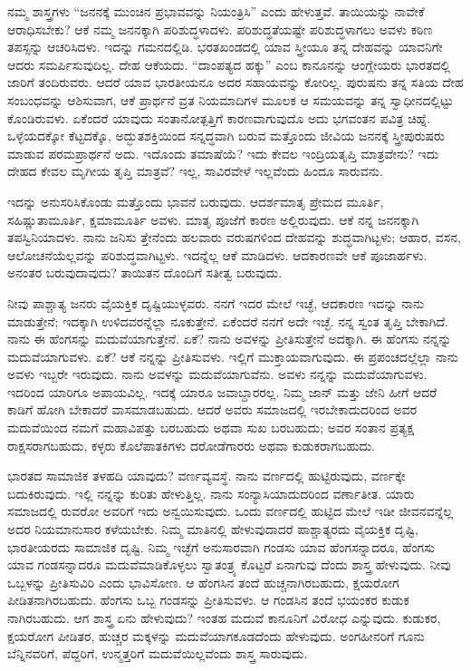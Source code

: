 ನಮ್ಮ ಶಾಸ್ತ್ರಗಳು “ಜನನಕ್ಕೆ ಮುಂಚಿನ ಪ್ರಭಾವವನ್ನು ನಿಯಂತ್ರಿಸಿ” ಎಂದು ಹೇಳುತ್ತವೆ. ತಾಯಿಯನ್ನು ನಾವೇಕೆ ಆರಾಧಿಸಬೇಕು? ಆಕೆ ನಮ್ಮ ಜನನಕ್ಕಾಗಿ ಪರಿಶುದ್ಧಳಾದಳು. ಪರಿಶುದ್ಧತೆಯಷ್ಟೇ ಪರಿಶುದ್ಧಳಾಗಲು ಅವಳು ಕಠಿಣ ತಪಸ್ಸನ್ನು ಆಚರಿಸಿದಳು. ಇದನ್ನು ಗಮನದಲ್ಲಿಡಿ. ಭರತಖಂಡದಲ್ಲಿ ಯಾವ ಸ್ತ್ರೀಯೂ ತನ್ನ ದೇಹವನ್ನು ಯಾವನಿಗೇ ಆದರು ಸಮರ್ಪಿಸುವುದಿಲ್ಲ. ದೇಹ ಆಕೆಯದು. “ದಾಂಪತ್ಯದ ಹಕ್ಕು” ಎಂಬ ಕಾನೂನನ್ನು ಆಂಗ್ಲೇಯರು ಭಾರತದಲ್ಲಿ ಜಾರಿಗೆ ತಂದಿರುವರು. ಆದರೆ ಯಾವ ಭಾರತೀಯನೂ ಅದರ ಸಹಾಯವನ್ನು ಕೋರಿಲ್ಲ. ಪುರುಷನು ತನ್ನ ಸತಿಯ ದೇಹ ಸಂಬಂಧವನ್ನು ಆಶಿಸುವಾಗ, ಆಕೆ ಪ್ರಾರ್ಥನೆ ವ್ರತ ನಿಯಮಾದಿಗಳ ಮೂಲಕ ಆ ಸಮಯವನ್ನು ತನ್ನ ಸ್ವಾಧೀನದಲ್ಲಿಟ್ಟು ಕೊಂಡಿರುವಳು. ಏಕೆಂದರೆ ಯಾವುದು ಸಂತಾನೋತ್ಪತ್ತಿಗೆ ಕಾರಣವಾಗುವುದೊ ಅದು ಭಗವಂತನ ಪವಿತ್ರ ಚಿಹ್ನೆ. ಒಳ್ಳೆಯದಕ್ಕೋ ಕೆಟ್ಟದಕ್ಕೊ, ಅದ್ಭುತಶಕ್ತಿಯಿಂದ ಸನ್ನದ್ಧವಾಗಿ ಬರುವ ಮತ್ತೊಂದು ಜೀವಿಯ ಜನನಕ್ಕೆ ಸ್ತ್ರೀಪುರುಷರು ಮಾಡುವ ಪರಮಪ್ರಾರ್ಥನೆ ಅದು. ಇದೊಂದು ತಮಾಷೆಯೆ? ಇದು ಕೇವಲ ಇಂದ್ರಿಯತೃಪ್ತಿ ಮಾತ್ರವೇನು? ಇದು ದೇಹದ ಕೇವಲ ಮೃಗೀಯ ತೃಪ್ತಿ ಮಾತ್ರವೆ? ಇಲ್ಲ, ಸಾವಿರವೇಳೆ ಇಲ್ಲವೆಂದು ಹಿಂದೂ ಸಾರುವನು.

ಇದನ್ನು ಅನುಸರಿಸಿಕೊಂಡು ಮತ್ತೊಂದು ಭಾವನೆ ಬರುವುದು. ಆದರ್ಶಮಾತೃ ಪ್ರೇಮದ ಮೂರ್ತಿ, ಸಹಿಷ್ಣುತಾಮೂರ್ತಿ, ಕ್ಷಮಾಮೂರ್ತಿ ಅವಳು. ಮಾತೃ ಪೂಜೆಗೆ ಕಾರಣ ಅಲ್ಲಿರುವುದು. ಆಕೆ ನನ್ನ ಜನನಕ್ಕಾಗಿ ತಪಸ್ವಿನಿಯಾದಳು. ನಾನು ಜನಿಸು ತ್ತೇನೆಂದು ಹಲವಾರು ವರುಷಗಳಿಂದ ದೇಹವನ್ನು ಶುದ್ಧವಾಗಿಟ್ಟಳು; ಆಹಾರ, ವಸನ, ಆಲೋಚನೆಯೆಲ್ಲವನ್ನು ಪರಿಶುದ್ಧವಾಗಿಟ್ಟಳು. ಇದನ್ನೆಲ್ಲ ಆಕೆ ಮಾಡಿದಳು. ಆದಕಾರಣವೇ ಆಕೆ ಪೂಜಾರ್ಹಳು. ಅನಂತರ ಬರುವುದಾವುದು? ತಾಯಿತನ ದೊಂದಿಗೆ ಸತೀತ್ವ ಬರುವುದು.

ನೀವು ಪಾಶ್ಚಾತ್ಯ ಜನರು ವೈಯಕ್ತಿಕ ದೃಷ್ಟಿಯುಳ್ಳವರು. ನನಗೆ ಇದರ ಮೇಲೆ ಇಚ್ಛೆ, ಆದಕಾರಣ ಇದನ್ನು ನಾನು ಮಾಡುತ್ತೇನೆ; ಇದಕ್ಕಾಗಿ ಉಳಿದವರನ್ನೆಲ್ಲಾ ನೂಕುತ್ತೇನೆ. ಏಕೆಂದರೆ ನನಗೆ ಅದೇ ಇಚ್ಛೆ. ನನ್ನ ಸ್ವಂತ ತೃಪ್ತಿ ಬೇಕಾಗಿದೆ. ನಾನು ಈ ಹೆಂಗಸನ್ನು ಮದುವೆಯಾಗುತ್ತೇನೆ. ಏಕೆ? ನಾನು ಅವಳನ್ನು ಪ್ರೀತಿಸುತ್ತೇನೆ ಅದಕ್ಕಾಗಿ. ಈ ಹೆಂಗಸು ನನ್ನನ್ನು ಮದುವೆಯಾಗುವಳು. ಏಕೆ? ಆಕೆ ನನ್ನನ್ನು ಪ್ರೀತಿಸುವಳು. ಇಲ್ಲಿಗೆ ಮುಕ್ತಾಯವಾಗುವುದು. ಈ ಪ್ರಪಂಚದಲ್ಲೆಲ್ಲಾ ನಾನು ಅವಳು ಇಬ್ಬರೇ ಇರುವುದು. ನಾನು ಅವಳನ್ನು ಮದುವೆಯಾಗುವೆನು. ಅವಳು ನನ್ನನ್ನು ಮದುವೆಯಾಗುವಳು. ಇದರಿಂದ ಯಾರಿಗೂ ಅಪಾಯವಿಲ್ಲ. ಇದಕ್ಕೆ ಯಾರೂ ಜವಾಬ್ದಾರರಲ್ಲ. ನಿಮ್ಮ ಜಾನ್​ ಮತ್ತು ಜೇನಿ ಹೀಗೆ ಆದರೆ ಕಾಡಿಗೆ ಹೋಗಿ ಬೇಕಾದರೆ ವಾಸಮಾಡಬಹುದು. ಆದರೆ ಅವರು ಸಮಾಜದಲ್ಲಿ ಇರಬೇಕಾದುದರಿಂದ ಅವರ ಮದುವೆಯಿಂದ ನಮಗೆ ಮಹಾವಿಪತ್ತು ಬರಬಹುದು ಅಥವಾ ಸುಖ ಬರಬಹುದು; ಅವರ ಸಂತಾನ ಪ್ರತ್ಯಕ್ಷ ರಾಕ್ಷಸರಾಗಬಹುದು, ಕಳ್ಳರು ಕೊಲೆಪಾತಕಿಗಳು ದರೋಡೆಗಾರರು ಅಥವಾ ಕುಡುಕರಾಗಬಹುದು.

ಭಾರತದ ಸಾಮಾಜಿಕ ತಳಹದಿ ಯಾವುದು? ವರ್ಣವ್ಯವಸ್ಥೆ. ನಾನು ವರ್ಣದಲ್ಲಿ ಹುಟ್ಟಿರುವುದು, ವರ್ಣಕ್ಕೇ ಬದುಕಿರುವುದು. ಇಲ್ಲಿ ನನ್ನನ್ನು ಕುರಿತು ಹೇಳುತ್ತಿಲ್ಲ. ನಾನು ಸಂನ್ಯಾಸಿಯಾದುದರಿಂದ ವರ್ಣಾತೀತ. ಯಾರು ಸಮಾಜದಲ್ಲಿ ರುವರೋ ಅವರಿಗೆ ಇದು ಅನ್ವಯಿಸುವುದು. ಒಂದು ವರ್ಣದಲ್ಲಿ ಹುಟ್ಟಿದ ಮೇಲೆ ಇಡೀ ಜೀವನವನ್ನೆಲ್ಲ ಅದರ ನಿಯಮಾನುಸಾರ ಕಳೆಯಬೇಕು. ನಿಮ್ಮ ಮಾತಿನಲ್ಲಿ ಹೇಳುವುದಾದರೆ ಪಾಶ್ಚಾತ್ಯರದು ವೈಯಕ್ತಿಕ ದೃಷ್ಟಿ, ಭಾರತೀಯರದು ಸಾಮಾಜಿಕ ದೃಷ್ಟಿ. ನಿಮ್ಮ ಇಚ್ಛೆಗೆ ಅನುಸಾರವಾಗಿ ಗಂಡಸು ಯಾವ ಹೆಂಗಸನ್ನಾದರೂ, ಹೆಂಗಸು ಯಾವ ಗಂಡಸನ್ನಾದರೂ ಮದುವೆಮಾಡಿಕೊಳ್ಳಲು ಸ್ವಾತಂತ್ರ್ಯ ಕೊಟ್ಟರೆ ಏನಾಗುವು ದೆಂದು ಶಾಸ್ತ್ರ ಹೇಳುವುದು. ನೀವು ಒಬ್ಬಳನ್ನು ಪ್ರೀತಿಸುವಿರಿ ಎಂದು ಭಾವಿಸೋಣ. ಆ ಹೆಂಗಸಿನ ತಂದೆ ಹುಚ್ಚನಾಗಿರಬಹುದು, ಕ್ಷಯರೋಗ ಪೀಡಿತನಾಗಿರಬಹುದು. ಹೆಂಗಸು ಒಬ್ಬ ಗಂಡಸನ್ನು ಪ್ರೀತಿಸುವಳು. ಆ ಗಂಡಸಿನ ತಂದೆ ಭಯಂಕರ ಕುಡುಕ ನಾಗಿರಬಹುದು. ಆಗ ಶಾಸ್ತ್ರ ಏನು ಹೇಳುವುದು? ಇಂತಹ ಮದುವೆ ಕಾನೂನಿಗೆ ವಿರೋಧ ಎನ್ನುವುದು. ಕುಡುಕರ, ಕ್ಷಯರೋಗ ಪೀಡಿತರ, ಹುಚ್ಚರ ಮಕ್ಕಳನ್ನು ಮದುವೆಯಾಗಕೂಡದೆಂದು ಹೇಳುವುದು. ಅಂಗಹೀನರಿಗೆ ಗೂನು ಬೆನ್ನಿನವರಿಗೆ, ಪೆದ್ದರಿಗೆ, ಉನ್ಮತ್ತರಿಗೆ ಮದುವೆಯಿಲ್ಲವೆಂದು ಶಾಸ್ತ್ರ ಸಾರುವುದು.

